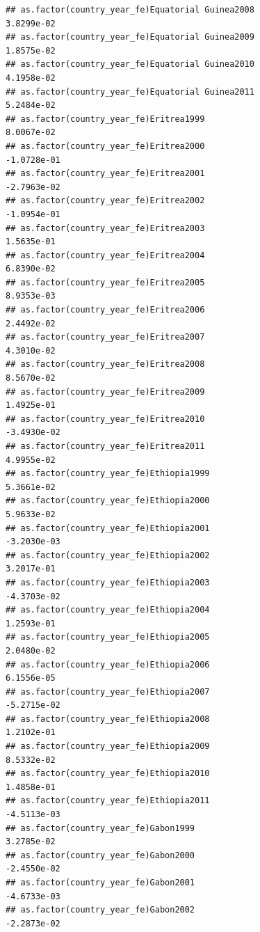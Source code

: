 \documentclass[
  a4paper,
]{article}
\begin{document}
\begin{verbatim}
## as.factor(country_year_fe)Equatorial Guinea2008                 3.8299e-02
## as.factor(country_year_fe)Equatorial Guinea2009                 1.8575e-02
## as.factor(country_year_fe)Equatorial Guinea2010                 4.1958e-02
## as.factor(country_year_fe)Equatorial Guinea2011                 5.2484e-02
## as.factor(country_year_fe)Eritrea1999                           8.0067e-02
## as.factor(country_year_fe)Eritrea2000                          -1.0728e-01
## as.factor(country_year_fe)Eritrea2001                          -2.7963e-02
## as.factor(country_year_fe)Eritrea2002                          -1.0954e-01
## as.factor(country_year_fe)Eritrea2003                           1.5635e-01
## as.factor(country_year_fe)Eritrea2004                           6.8390e-02
## as.factor(country_year_fe)Eritrea2005                           8.9353e-03
## as.factor(country_year_fe)Eritrea2006                           2.4492e-02
## as.factor(country_year_fe)Eritrea2007                           4.3010e-02
## as.factor(country_year_fe)Eritrea2008                           8.5670e-02
## as.factor(country_year_fe)Eritrea2009                           1.4925e-01
## as.factor(country_year_fe)Eritrea2010                          -3.4930e-02
## as.factor(country_year_fe)Eritrea2011                           4.9955e-02
## as.factor(country_year_fe)Ethiopia1999                          5.3661e-02
## as.factor(country_year_fe)Ethiopia2000                          5.9633e-02
## as.factor(country_year_fe)Ethiopia2001                         -3.2030e-03
## as.factor(country_year_fe)Ethiopia2002                          3.2017e-01
## as.factor(country_year_fe)Ethiopia2003                         -4.3703e-02
## as.factor(country_year_fe)Ethiopia2004                          1.2593e-01
## as.factor(country_year_fe)Ethiopia2005                          2.0480e-02
## as.factor(country_year_fe)Ethiopia2006                          6.1556e-05
## as.factor(country_year_fe)Ethiopia2007                         -5.2715e-02
## as.factor(country_year_fe)Ethiopia2008                          1.2102e-01
## as.factor(country_year_fe)Ethiopia2009                          8.5332e-02
## as.factor(country_year_fe)Ethiopia2010                          1.4858e-01
## as.factor(country_year_fe)Ethiopia2011                         -4.5113e-03
## as.factor(country_year_fe)Gabon1999                             3.2785e-02
## as.factor(country_year_fe)Gabon2000                            -2.4550e-02
## as.factor(country_year_fe)Gabon2001                            -4.6733e-03
## as.factor(country_year_fe)Gabon2002                            -2.2873e-02

\end{verbatim}
\end{document}
